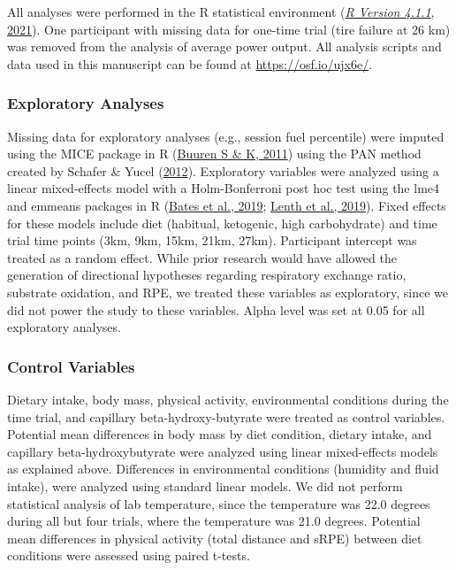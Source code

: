 \documentclass[]{cik}%
\begin{document}
All analyses were performed in the R statistical environment
(\protect\hyperlink{ref-31}{\emph{R Version 4.1.1}, 2021}). One
participant with missing data for one-time trial (tire failure at 26 km)
was removed from the analysis of average power output. All analysis
scripts and data used in this manuscript can be found at
\url{https://osf.io/ujx6e/}.

\hypertarget{exploratory-analyses}{%
\subsubsection{Exploratory Analyses}\label{exploratory-analyses}}

Missing data for exploratory analyses (e.g., session fuel percentile)
were imputed using the MICE package in R
(\protect\hyperlink{ref-48}{Buuren S \& K, 2011}) using the PAN method
created by Schafer \& Yucel (\protect\hyperlink{ref-49}{2012}).
Exploratory variables were analyzed using a linear mixed-effects model
with a Holm-Bonferroni post hoc test using the lme4 and emmeans packages
in R (\protect\hyperlink{ref-50}{Bates et al., 2019};
\protect\hyperlink{ref-51}{Lenth et al., 2019}). Fixed effects for these
models include diet (habitual, ketogenic, high carbohydrate) and time
trial time points (3km, 9km, 15km, 21km, 27km). Participant intercept
was treated as a random effect. While prior research would have allowed
the generation of directional hypotheses regarding respiratory exchange
ratio, substrate oxidation, and RPE, we treated these variables as
exploratory, since we did not power the study to these variables. Alpha
level was set at 0.05 for all exploratory analyses.

\hypertarget{control-variables}{%
\subsubsection{Control Variables}\label{control-variables}}

Dietary intake, body mass, physical activity, environmental conditions
during the time trial, and capillary beta-hydroxy-butyrate were treated
as control variables. Potential mean differences in body mass by diet
condition, dietary intake, and capillary beta-hydroxybutyrate were
analyzed using linear mixed-effects models as explained above.
Differences in environmental conditions (humidity and fluid intake),
were analyzed using standard linear models. We did not perform
statistical analysis of lab temperature, since the temperature was 22.0
degrees during all but four trials, where the temperature was 21.0
degrees. Potential mean differences in physical activity (total distance
and sRPE) between diet conditions were assessed using paired t-tests.
\end{document}
